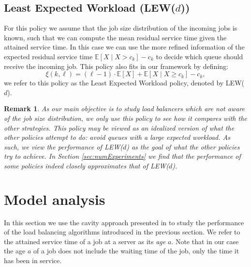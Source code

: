 \documentclass[12pt]{report}
\newcommand{\E}{\mathbb{E}}
\newtheorem{remark}{Remark}
\begin{document}
\subsection{Least Expected Workload (LEW($d$))}
For this policy we assume that the job size distribution of the incoming jobs is known, such that
we can compute the mean residual service time given the attained service time. In this case we can use the more refined information of the expected residual service time $\E[X \mid X > c_k] - c_k$ to decide which queue should receive the incoming job. This policy also fits in our framework by defining:
\begin{equation}\label{eq:xi_EW}
\xi(k, \ell)=(\ell-1) \cdot \E[X] + \E[X \mid X \geq c_k] - c_k,
\end{equation}
we refer to this policy as the Least Expected Workload policy, denoted by LEW($d$).
\begin{remark}
As our main objective is to study load balancers which are not aware of the job size distribution, we only use this policy to see how it compares with the other strategies. This policy may be viewed as an idealized version of what the other policies attempt to do: avoid queues with a large expected workload. As such, we view the performance of LEW($d$) as the goal of what the other policies try to achieve. In Section \ref{sec:numExperiments} we find that the performance of some policies indeed closely approximates that of LEW($d$).
\end{remark}

\section{Model analysis} \label{sec:analysis}

In this section we use the cavity approach presented in \cite{bramsonLB} to study the 
performance of the load balancing algorithms introduced in the previous section. We refer to the attained service time of a job
at a server as its {\it age} $a$. Note that in our case the age $a$ of a job does not include the
waiting time of the job, only the time it has been in service.
\end{document}

